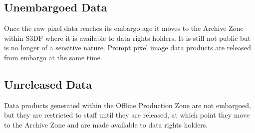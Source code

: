 \subsection{Unembargoed Data}
Once the raw pixel data reaches its embargo age it moves to the Archive Zone within \gls{S3DF} where it is available to data rights holders. It is still not public but is no longer of a sensitive nature.
Prompt pixel image data products are released from embargo at the same time.

\subsection{Unreleased Data}
Data products generated within the Offline Production Zone are not embargoed, but they are restricted to staff until they are released, at which point they move to the Archive Zone and are made available to data rights holders.
